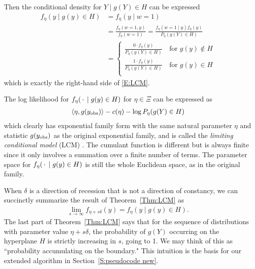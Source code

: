 Then the conditional density for $Y \mid g(Y)\in H$ can be expressed
\begin{align*}
	f_\eta(y \mid g(y) \in H) &= f_\eta(y \mid w=1) \\
					&= \frac{f_\eta(w=1, y)}{f_\eta(w=1)}	
					= \frac{f_\eta(w=1 \mid y) f_\eta(y)}{P_\eta(g(Y) \in H)}  \\%
	&= \begin{cases}
 			\frac{0 \cdot f_\eta(y)}{P_\eta(g(Y) \in H)}   \quad 
					 \text{for $g(y) \notin H$}	\\
 			\frac{1 \cdot f_\eta(y)}{P_\eta(g(Y) \in H)}   \quad 
					 \text{for $g(y) \in H$}	\\
 		\end{cases}
\end{align*}
which is exactly the right-hand side of \eqref{E:LCM}.

The log likelihood for $f_\eta( \,\cdot\, \mid g(y) \in H)$ for $\eta \in \Xi$ can be expressed as
\begin{align*}
	\langle \eta, g(y_{\text{obs}}) \rangle - c(\eta) - \log P_\eta(g(Y) \in H) 
\end{align*}
which clearly has exponential family form with the same natural parameter $\eta$ and 
statistic $g(y_{\text{obs}})$ as the original exponential family,
and is called the \emph{limiting conditional model} (LCM) \citep{Geyer:gdor}.  
The cumulant function is different but is always finite since it only 
involves a summation over a finite number of terms.  The parameter space for 
$f_\eta( \,\cdot\, \mid g(y) \in H)$ is still the 
whole Euclidean space, as in the original family.  

When $\delta$ is a direction of recession that is not a direction of constancy, 
we can succinctly summarize the result of Theorem~\ref{Thm:LCM} as
\begin{align*}
\lim_{s \to \infty} f_{\eta+s\delta}(y) = f_{\eta}( y \mid g(y) \in H).
\end{align*}
The last part of Theorem~\ref{Thm:LCM} says that for the sequence of distributions with parameter 
value $\eta+s\delta$, the probability of $g(Y)$ occurring on the hyperplane $H$ is strictly 
increasing in $s$, going to 1.  We may think of this as 
``probability accumulating on the boundary."  This intuition is the basis for our
extended algorithm in Section~\ref{S:pseudocode new}.

